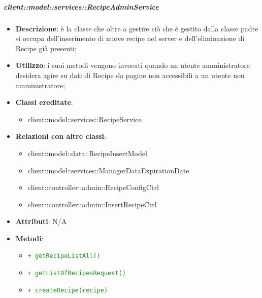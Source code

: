 		\subparagraph{client::model::services::RecipeAdminService} %
		\label{subp:client_model_services_recipeadminservice}
			\begin{itemize}
				\item \textbf{Descrizione}: è la classe che oltre a gestire ciò che è gestito dalla classe padre si occupa dell'inserimento di nuove recipe nel server e dell'eliminazione di Recipe già presenti;
				\item \textbf{Utilizzo}: i suoi metodi vengono invocati quando un utente amministratore desidera agire su dati di Recipe da pagine non accessibili a un utente non amministratore;
				\item \textbf{Classi ereditate}:
					\begin{itemize}
						\item client::model::services::RecipeService
					\end{itemize}
				\item \textbf{Relazioni con altre classi}:
					\begin{itemize}
						\item client::model::data::RecipeInsertModel
						\item client::model::services::ManagerDataExpirationDate
						\item client::controller::admin::RecipeConfigCtrl
						\item client::controller::admin::InsertRecipeCtrl
					\end{itemize}
				\item \textbf{Attributi}: N/A
				\item \textbf{Metodi}:
				\begin{itemize}
					\item \textcolor{forestgreen}{\texttt{+ getRecipeListAll()}}
					\item \textcolor{forestgreen}{\texttt{+ getListOfRecipesRequest()}}
					\item \textcolor{forestgreen}{\texttt{+ createRecipe(recipe)}}

\end{itemize}
\end{itemize}
